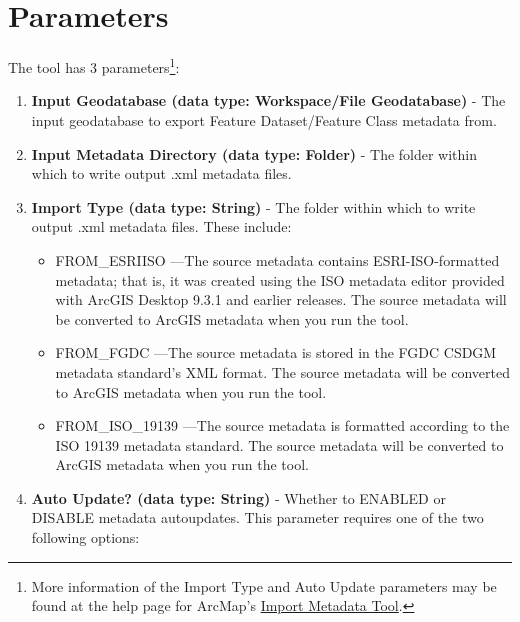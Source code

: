 \documentclass[openany]{book}
\providecommand{\tightlist}{%
  \setlength{\itemsep}{0pt}\setlength{\parskip}{0pt}}
\let\rmarkdownfootnote\footnote%
\def\footnote{\protect\rmarkdownfootnote}
\theoremstyle{definition}
\theoremstyle{definition}
\theoremstyle{definition}
\theoremstyle{remark}
\begin{document}
\section{Parameters}\label{parameters-11}

The tool has 3 parameters\footnote{More information of the Import Type
  and Auto Update parameters may be found at the help page for ArcMap's
  \href{http://desktop.arcgis.com/en/arcmap/latest/tools/conversion-toolbox/import-metadata.htm}{Import
  Metadata Tool}.}:

\begin{enumerate}
\def\labelenumi{\arabic{enumi}.}
\tightlist
\item
  \textbf{Input Geodatabase (data type: Workspace/File Geodatabase)} -
  The input geodatabase to export Feature Dataset/Feature Class metadata
  from.
\item
  \textbf{Input Metadata Directory (data type: Folder)} - The folder
  within which to write output .xml metadata files.
\item
  \textbf{Import Type (data type: String)} - The folder within which to
  write output .xml metadata files. These include:

  \begin{itemize}
  \tightlist
  \item
    FROM\_ESRIISO ---The source metadata contains ESRI-ISO-formatted
    metadata; that is, it was created using the ISO metadata editor
    provided with ArcGIS Desktop 9.3.1 and earlier releases. The source
    metadata will be converted to ArcGIS metadata when you run the tool.
  \item
    FROM\_FGDC ---The source metadata is stored in the FGDC CSDGM
    metadata standard's XML format. The source metadata will be
    converted to ArcGIS metadata when you run the tool.
  \item
    FROM\_ISO\_19139 ---The source metadata is formatted according to
    the ISO 19139 metadata standard. The source metadata will be
    converted to ArcGIS metadata when you run the tool.
  \end{itemize}
\item
  \textbf{Auto Update? (data type: String)} - Whether to ENABLED or
  DISABLE metadata autoupdates. This parameter requires one of the two
  following options:


\end{enumerate}
\end{document}
